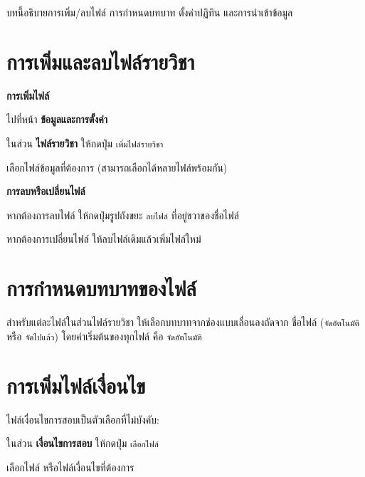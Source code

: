 
\noindent บทนี้อธิบายการเพิ่ม/ลบไฟล์ การกำหนดบทบาท ตั้งค่าปฏิทิน และการนำเข้าข้อมูล

\section{การเพิ่มและลบไฟล์รายวิชา}

\noindent\textbf{การเพิ่มไฟล์}
\begin{steps}
  \item ไปที่หน้า \textbf{ข้อมูลและการตั้งค่า}
  \item ในส่วน \textbf{ไฟล์รายวิชา} ให้กดปุ่ม \texttt{เพิ่มไฟล์รายวิชา}
  \item เลือกไฟล์ข้อมูลที่ต้องการ (สามารถเลือกได้หลายไฟล์พร้อมกัน)
\end{steps}

\noindent\textbf{การลบหรือเปลี่ยนไฟล์}
\begin{steps}
  \item หากต้องการลบไฟล์ ให้กดปุ่มรูปถังขยะ \texttt{ลบไฟล์} ที่อยู่ขวาของชื่อไฟล์
  \item หากต้องการเปลี่ยนไฟล์ ให้ลบไฟล์เดิมแล้วเพิ่มไฟล์ใหม่
\end{steps}

\section{การกำหนดบทบาทของไฟล์}

สำหรับแต่ละไฟล์ในส่วนไฟล์รายวิชา ให้เลือกบทบาทจากช่องแบบเลื่อนลงถัดจาก
ชื่อไฟล์ (\texttt{จัดอัตโนมัติ} หรือ \texttt{จัดไปแล้ว}) โดยค่าเริ่มต้นของทุกไฟล์
คือ \texttt{จัดอัตโนมัติ}

\section{การเพิ่มไฟล์เงื่อนไข}

ไฟล์เงื่อนไขการสอบเป็นตัวเลือกที่ไม่บังคับ:

\begin{steps}
  \item ในส่วน \textbf{เงื่อนไขการสอบ} ให้กดปุ่ม \texttt{เลือกไฟล์}
  \item เลือกไฟล์  หรือไฟล์เงื่อนไขที่ต้องการ
\end{steps}

